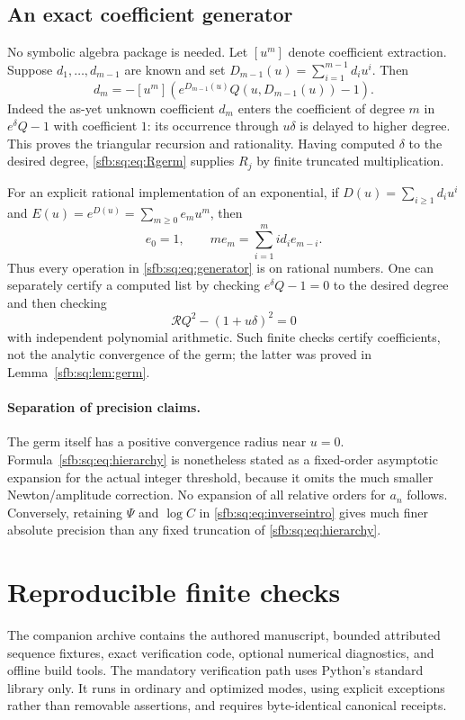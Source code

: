 \documentclass[11pt]{article}
\theoremstyle{remark}\newtheorem{remark}[theorem]{Remark}
\begin{document}
\subsection{An exact coefficient generator}
No symbolic algebra package is needed. Let $[u^m]$ denote coefficient extraction. Suppose $d_1,\ldots,d_{m-1}$ are known and set $D_{m-1}(u)=\sum_{i=1}^{m-1}d_i u^i$. Then
\begin{equation}\label{sfb:sq:eq:generator}
 d_m=-[u^m]\left(e^{D_{m-1}(u)}Q(u,D_{m-1}(u))-1\right).
\end{equation}
Indeed the as-yet unknown coefficient $d_m$ enters the coefficient of degree $m$ in $e^\delta Q-1$ with coefficient $1$: its occurrence through $u\delta$ is delayed to higher degree. This proves the triangular recursion and rationality. Having computed $\delta$ to the desired degree, \eqref{sfb:sq:eq:Rgerm} supplies $R_j$ by finite truncated multiplication.

For an explicit rational implementation of an exponential, if $D(u)=\sum_{i\ge1}d_i u^i$ and $E(u)=e^{D(u)}=\sum_{m\ge0}e_m u^m$, then
\begin{equation}\label{sfb:sq:eq:expcoeff}
 e_0=1,\qquad m e_m=\sum_{i=1}^m i d_i e_{m-i}.
\end{equation}
Thus every operation in \eqref{sfb:sq:eq:generator} is on rational numbers. One can separately certify a computed list by checking $e^\delta Q-1=0$ to the desired degree and then checking
\begin{equation}\label{sfb:sq:eq:independentR}
 \mathcal R Q^2-(1+u\delta)^2=0
\end{equation}
with independent polynomial arithmetic. Such finite checks certify coefficients, not the analytic convergence of the germ; the latter was proved in Lemma~\ref{sfb:sq:lem:germ}.

\paragraph{Separation of precision claims.}
The germ itself has a positive convergence radius near $u=0$. Formula~\eqref{sfb:sq:eq:hierarchy} is nonetheless stated as a fixed-order asymptotic expansion for the actual integer threshold, because it omits the much smaller Newton/amplitude correction. No expansion of all relative orders for $a_n$ follows. Conversely, retaining $\Psi$ and $\log C$ in \eqref{sfb:sq:eq:inverseintro} gives much finer absolute precision than any fixed truncation of \eqref{sfb:sq:eq:hierarchy}.

\section{Reproducible finite checks}\label{sfb:sq:sec:checks}
The companion archive contains the authored manuscript, bounded attributed sequence fixtures, exact verification code, optional numerical diagnostics, and offline build tools. The mandatory verification path uses Python's standard library only. It runs in ordinary and optimized modes, using explicit exceptions rather than removable assertions, and requires byte-identical canonical receipts.
\end{document}
